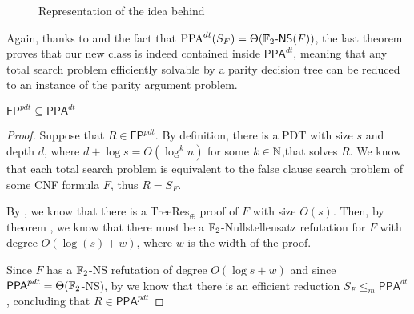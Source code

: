 \begin{figure}[H]

    \caption{Representation of the idea behind }
\end{figure}

\quad

Again, thanks to  and the fact that $\mathrm{PPA}^{dt}(S_F) = \Theta(\mathbb{F}_2\text{-}\mathsf{NS}(F))$, the last theorem proves that our new class is indeed contained inside $\mathsf{PPA}^{dt}$, meaning that any total search problem efficiently solvable by a parity decision tree can be reduced to an instance of the parity argument problem.  

\begin{theorem}
    $\mathsf{FP}^{pdt} \subseteq \mathsf{PPA}^{dt}$
\end{theorem}

\begin{proof}
 Suppose that $R \in \mathsf{FP}^{pdt}$. By definition, there is a PDT with size $s$ and depth $d$, where $d+\log s = O(\log^k n)$ for some $k \in \mathbb{N}$,that solves $R$. We know that each total search problem is equivalent to the false clause search problem of some CNF formula $F$, thus $R = S_F$.
    
 By , we know that there is a \textsf{TreeRes}$_{\oplus}$ proof of $F$ with size $O(s)$. Then, by theorem , we know that there must be a $\mathbb{F}_2$-Nullstellensatz refutation for $F$ with degree $O(\log(s) + w)$, where $w$ is the width of the proof. 
    
 Since $F$ has a $\mathbb{F}_2$-\textsf{NS} refutation of degree $O(\log s + w)$ and since $\mathsf{PPA}^{pdt} = \Theta(\mathbb{F}_2$-\textsf{NS}), by  we know that there is an efficient reduction $S_F \leq_m \mathsf{PPA}^{dt}$, concluding that $R \in \mathsf{PPA}^{pdt}$

\end{proof}

\newpage



\cleardoublepage